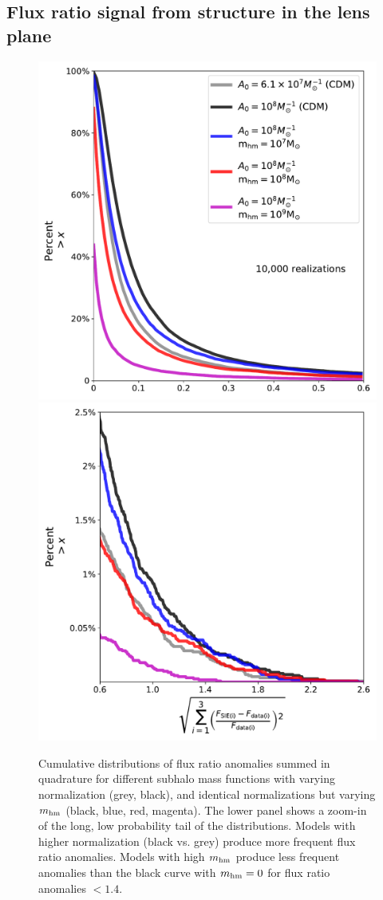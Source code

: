 \subsection{Flux ratio signal from structure in the lens plane}
\label{ssec:signal}

\begin{figure}
	\includegraphics[clip,trim=0cm 0cm 0.3cm
	0cm,width=.48\textwidth,keepaspectratio]{./figures_ABCforward/nfw_summed_cusp_edited.pdf}
	\includegraphics[clip,trim=0.2cm 0cm .3cm
	0cm,width=.48\textwidth]{./figures_ABCforward/nfw_summed_tail_cusp.pdf}
	\caption[Cumulative distribution of flux ratio anomalies for different subhalo mass functions]{\label{fig:fluxratios} Cumulative distributions of flux ratio anomalies summed in quadrature for different subhalo mass functions with varying normalization (grey, black), and identical normalizations but varying $m_{\rm{hm}}$ (black, blue, red, magenta). The lower panel shows a zoom-in of the long, low probability tail of the distributions. Models with higher normalization (black vs. grey) produce more frequent flux ratio anomalies. Models with high $m_{\rm{hm}}$ produce less frequent anomalies than the black curve with $m_{\rm{hm}} = 0$ for flux ratio anomalies $<1.4$.}
\end{figure}

